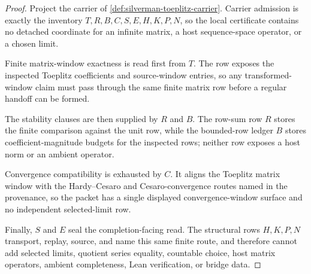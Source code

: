 \begin{proof}
Project the carrier of \autoref{def:silverman-toeplitz-carrier}. Carrier admission is exactly the inventory $T,R,B,C,S,E,H,K,P,N$, so the local certificate contains no detached coordinate for an infinite matrix, a host sequence-space operator, or a chosen limit.

Finite matrix-window exactness is read first from $T$. The row exposes the inspected Toeplitz coefficients and source-window entries, so any transformed-window claim must pass through the same finite matrix row before a regular handoff can be formed.

The stability clauses are then supplied by $R$ and $B$. The row-sum row $R$ stores the finite comparison against the unit row, while the bounded-row ledger $B$ stores coefficient-magnitude budgets for the inspected rows; neither row exposes a host norm or an ambient operator.

Convergence compatibility is exhausted by $C$. It aligns the Toeplitz matrix window with the Hardy--Cesaro and Cesaro-convergence routes named in the provenance, so the packet has a single displayed convergence-window surface and no independent selected-limit row.

Finally, $S$ and $E$ seal the completion-facing read. The structural rows $H,K,P,N$ transport, replay, source, and name this same finite route, and therefore cannot add selected limits, quotient series equality, countable choice, host matrix operators, ambient completeness, Lean verification, or bridge data.
\end{proof}

